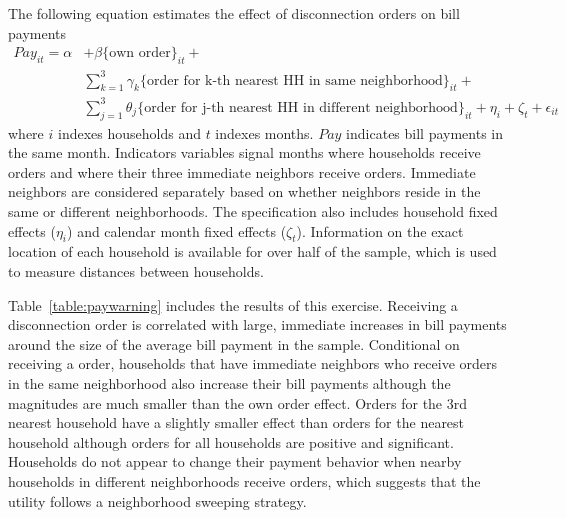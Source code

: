 \documentclass[12pt,table]{article}
\begin{document}
The following equation estimates the effect of disconnection orders on bill payments
\begin{align*}
Pay_{it} = \alpha &+ \beta  \{ \text{own order} \}_{it} + \\
 &\sum_{k=1}^{3} \gamma_k \{ \text{order for k-th nearest HH in same neighborhood} \}_{it} +  \\
 &\sum_{j=1}^{3} \theta_j \{ \text{order for j-th nearest HH in different neighborhood} \}_{it} + \eta_i + \zeta_t + \epsilon_{it}
\end{align*}
where $i$ indexes households and $t$ indexes months.  $Pay$ indicates bill payments in the same month.  Indicators variables signal months where households receive orders and where their three immediate neighbors receive orders.  Immediate neighbors are considered separately based on whether neighbors reside in the same or different neighborhoods.  The specification also includes household fixed effects ($\eta_i$) and calendar month fixed effects ($\zeta_t$).  Information on the exact location of each household is available for over half of the sample, which is used to measure distances between households.

Table~\ref{table:paywarning} includes the results of this exercise.  Receiving a disconnection order is correlated with large, immediate increases in bill payments around the size of the average bill payment in the sample.  Conditional on receiving a order, households that have immediate neighbors who receive orders in the same neighborhood also increase their bill payments although the magnitudes are much smaller than the own order effect.  Orders for the 3rd nearest household have a slightly smaller effect than orders for the nearest household although orders for all households are positive and significant.  Households do not appear to change their payment behavior when nearby households in different neighborhoods receive orders, which suggests that the utility follows a neighborhood sweeping strategy.
\end{document}
